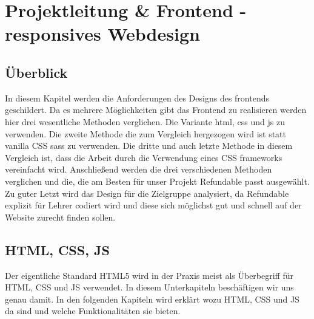 \section{Projektleitung \& Frontend - responsives Webdesign}
	\subsection{Überblick}
	In diesem Kapitel werden die Anforderungen des Designs des \Gls{frontend}s geschildert. Da es mehrere Möglichkeiten gibt das Frontend zu realisieren werden hier drei wesentliche Methoden verglichen. Die Variante \Gls{html}, \Gls{css} und \Gls{js} zu verwenden. Die zweite Methode die zum Vergleich hergezogen wird ist statt \Gls{vanilla} CSS \Gls{sass} zu verwenden. Die dritte und auch letzte Methode in diesem Vergleich ist, dass die Arbeit durch die Verwendung eines CSS \Gls{framework}s vereinfacht wird. Anschließend werden die drei verschiedenen Methoden verglichen und die, die am Besten für unser Projekt Refundable passt ausgewählt. Zu guter Letzt wird das Design für die Zielgruppe analysiert, da Refundable explizit für Lehrer codiert wird und diese sich möglichst gut und schnell auf der Website zurecht finden sollen.
	
	\subsection{HTML, CSS, JS}
	Der eigentliche Standard HTML5 wird in der Praxis meist als Überbegriff für HTML, CSS und JS verwendet. In diesem Unterkapiteln beschäftigen wir uns genau damit.\cite{html5-css3-handbuch} In den folgenden Kapiteln wird erklärt wozu HTML, CSS und JS da sind und welche Funktionalitäten sie bieten.
	
